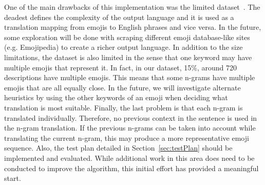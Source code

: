\documentclass{article}[10]
\begin{document}
One of the main drawbacks of this implementation was the limited
dataset~\cite{Eisner_2016}. The deadest defines the complexity of the output
language and it is used as a translation mapping from emojis to English phrases
and vice versa. In the future, some exploration will be done with scraping
different emoji database-like sites (e.g. Emojipedia) to create a richer output
language. In addition to the size limitations, the dataset is also limited in
the sense that one keyword may have multiple emojis that represent it. In fact,
in our dataset, 15\%, around 720 descriptions have multiple emojis. This means
that some n-grams have multiple emojis that are all equally close. In the
future, we will investigate alternate heuristics by using the other keywords of
an emoji when deciding what translation is most suitable. Finally, the last
problem is that each n-gram is translated individually. Therefore, no previous
context in the sentence is used in the n-gram translation. If the previous
n-grams can be taken into account while translating the current n-gram, this may
produce a more representative emoji sequence. Also, the test plan detailed in
Section~\ref{sec:testPlan} should be implemented and evaluated. While additional
work in this area does need to be conducted to improve the algorithm, this
initial effort has provided a meaningful start.

\makeatother  
\end{document}
